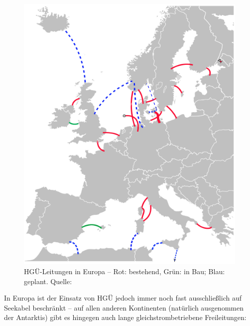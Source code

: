 \begin{figure}[htbn]
\begin{center}
\noindent
\includegraphics[scale=0.5]{HVDC_Europe.png}
\end{center}
\caption{HGÜ-Leitungen in Europa -- Rot: bestehend, Grün: in Bau; Blau: geplant. Quelle: \cite{Europa}}
\label{pic:Europa}
\end{figure}

In Europa ist der Einsatz von HGÜ jedoch immer noch fast ausschließlich auf Seekabel beschränkt -- auf allen anderen Kontinenten (natürlich ausgenommen der Antarktis) gibt es hingegen auch lange gleichstrombetriebene Freileitungen:


